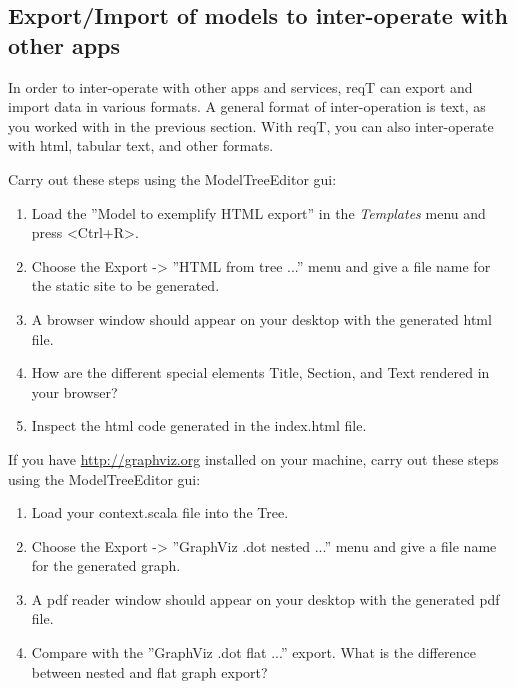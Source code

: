 \documentclass[11pt]{article}
\begin{document}
\subsection{Export/Import of models to inter-operate with other apps}

In order to inter-operate with other apps and services, reqT can export and import data in various formats. A general format of inter-operation is text, as you worked with in the previous section. With reqT, you can also inter-operate with html, tabular text, and other formats.

\begin{framed}
\noindent Carry out these steps using the ModelTreeEditor gui:
\begin{enumerate}
\item Load the ''Model to exemplify HTML export'' in the {\it Templates} menu and press <Ctrl+R>.
\item Choose the Export -> ''HTML from tree ...'' menu and give a file name for the static site to be generated.
\item A browser window should appear on your desktop with the generated html file.
\item How are the different special elements Title, Section, and Text rendered in your browser? \newline\newline\underline{\hspace{10cm}}\newline
\item Inspect the html code generated in the index.html file. 
\end{enumerate}
\end{framed}


\begin{framed}
If you have \url{http://graphviz.org} installed on your machine, carry out these steps using the ModelTreeEditor gui:
\begin{enumerate}
\item Load your context.scala file into the Tree.
\item Choose the Export -> ''GraphViz .dot nested ...'' menu and give a file name for the generated graph.
\item A pdf reader window should appear on your desktop with the generated pdf file.
\item Compare with the ''GraphViz .dot flat ...'' export. \newline What is the difference between nested and flat graph export?
\newline\newline\underline{\hspace{10cm}}
\end{enumerate}
\end{framed}
\end{document}
